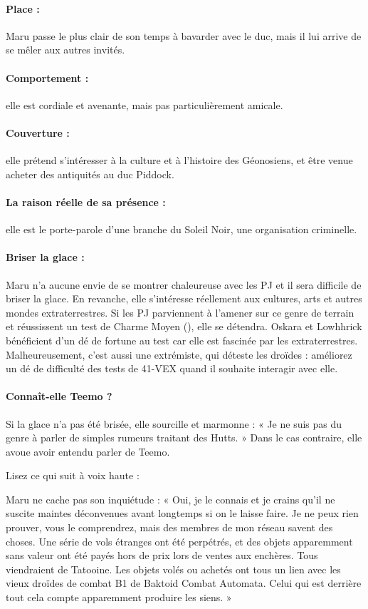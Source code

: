 \documentclass[a4paper,10pt,twoside,twocolumn,openany]{book}
\begin{document}
\paragraph{Place :} Maru passe le plus clair de son temps à bavarder avec le duc, mais il lui arrive de se mêler aux autres
invités.

\paragraph{Comportement :} elle est cordiale et avenante, mais pas
particulièrement amicale.

\paragraph{Couverture :} elle prétend s’intéresser à la culture et à
l’histoire des Géonosiens, et être venue acheter des antiquités au duc Piddock.

\paragraph{La raison réelle de sa présence :} elle est le porte-parole d’une branche du Soleil Noir, une organisation
criminelle.
\paragraph{Briser la glace :} Maru n’a aucune envie de se montrer
chaleureuse avec les PJ et il sera difficile de briser la glace.
En revanche, elle s’intéresse réellement aux cultures, arts
et autres mondes extraterrestres. Si les PJ parviennent
à l’amener sur ce genre de terrain et réussissent un test
de Charme Moyen (\difficulty \difficulty), elle se détendra. Oskara et
Lowhhrick bénéficient d’un dé de fortune \boost au test car
elle est fascinée par les extraterrestres. Malheureusement, c’est aussi une extrémiste, qui déteste les droïdes :
améliorez un dé de difficulté des tests de 41-VEX quand
il souhaite interagir avec elle.
\paragraph{Connaît-elle Teemo ?} Si la glace n’a pas été brisée, elle
sourcille et marmonne : « Je ne suis pas du genre à parler de simples rumeurs traitant des Hutts. » Dans le cas
contraire, elle avoue avoir entendu parler de Teemo.



Lisez ce qui suit à voix haute :
\begin{quotebox}
Maru ne cache pas son inquiétude : « Oui, je le
connais et je crains qu’il ne suscite maintes déconvenues avant longtemps si on le laisse faire. Je
ne peux rien prouver, vous le comprendrez, mais
des membres de mon réseau savent des choses.
Une série de vols étranges ont été perpétrés, et
des objets apparemment sans valeur ont été
payés hors de prix lors de ventes aux enchères.
Tous viendraient de Tatooine. Les objets volés ou
achetés ont tous un lien avec les vieux droïdes de
combat B1 de Baktoid Combat Automata. Celui
qui est derrière tout cela compte apparemment
produire les siens. »
\end{quotebox}
\end{document}
